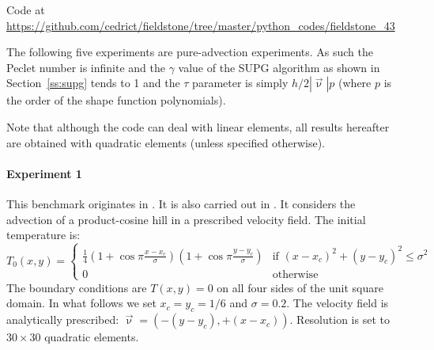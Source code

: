 
Code at \url{https://github.com/cedrict/fieldstone/tree/master/python_codes/fieldstone_43}

The following five experiments are pure-advection experiments. As such the Peclet number
is infinite and the $\gamma$ value of the SUPG algorithm as shown in Section~\ref{ss:supg} tends to 1
and the $\tau$ parameter is simply $h/2 |\vec\upnu| p$ (where $p$ is the order of the shape function polynomials).

Note that although the code can deal with linear elements, all results hereafter are obtained with quadratic elements (unless specified otherwise). 

\paragraph{Experiment 1}

This benchmark originates in \cite{dohu03}. It is also carried out in \cite{bepo10}.
It considers the advection of a product-cosine hill
in a prescribed velocity field. The initial temperature is:
\begin{equation}
T_0(x,y)=
\left\{
\begin{array}{cc}
\frac{1}{4}
\left(1+\cos \pi\frac{x-x_c}{\sigma}\right)
\left(1+\cos \pi\frac{y-y_c}{\sigma}\right)
& \text{if } (x-x_c)^2+(y-y_c)^2\leq \sigma^2 \\
0 & \text{otherwise}
\end{array}
\right.
\end{equation}
The boundary conditions are $T(x,y)=0$ on all four sides of the unit square domain. 
In what follows we set $x_c=y_c=1/6$ and $\sigma=0.2$.  
The velocity field is analytically prescribed: $\vec\upnu=(-(y-y_c),+(x-x_c))$.
Resolution is set to $30\times30$ quadratic elements.

